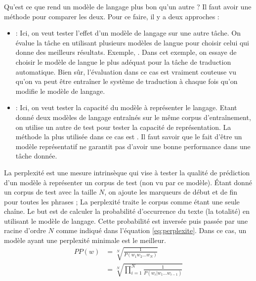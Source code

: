 \documentclass{KodeBook}
\begin{document}
Qu'est ce que rend un modèle de langage plus bon qu'un autre ? 
Il faut avoir une méthode pour comparer les deux. 
Pour ce faire, il y a deux approches : 
	\begin{itemize}
		\item {} : Ici, on veut tester l'effet d'un modèle de langage sur une autre tâche. 
		On évalue la tâche en utilisant plusieurs modèles de langue pour choisir celui qui donne des meilleurs résultats.
		Exemple, . 
		Dans cet exemple, on essaye de choisir le modèle de langue le plus adéquat pour la tâche de traduction automatique.
		Bien sûr, l'évaluation dans ce cas est vraiment couteuse vu qu'on va peut être entraîner le système de traduction à chaque fois qu'on modifie le modèle de langage.
		
		\item {} : Ici, on veut tester la capacité du modèle à représenter le langage. 
		Etant donné deux modèles de langage entraînés sur le même corpus d'entraînement, on utilise un autre de test pour tester la capacité de représentation.
		La méthode la plus utilisée dans ce cas est .
		Il faut savoir que le fait d'être un modèle représentatif ne garantit pas d'avoir une bonne performance dans une tâche donnée.
	\end{itemize}


La perplexité est une mesure intrinsèque qui vise à tester la qualité de prédiction d'un modèle à représenter un corpus de test (non vu par ce modèle). 
Étant donné un corpus de test avec la taille $N$, on ajoute les marqueurs de début et de fin pour toutes les phrases ; La perplexité traite le corpus comme étant une seule chaîne. 
Le but est de calculer la probabilité d'occurrence du texte (la totalité) en utilisant le modèle de langage. 
Cette probabilité est inversée puis passée par une racine d'ordre $N$ comme indiqué dans l'équation \ref{eq:perplexite}.
Dans ce cas, un modèle ayant une perplexité minimale est le meilleur.
%
\begin{align}
	PP(w) & = \sqrt[N]{\frac{1}{P(w_1 w_2 \ldots w_N)}} \nonumber\\
	 & = \sqrt[N]{\prod\limits_{i=1}^{N}\frac{1}{P(w_i | w_1 \ldots w_{i-1})}} \label{eq:perplexite}
\end{align}
\end{document}
